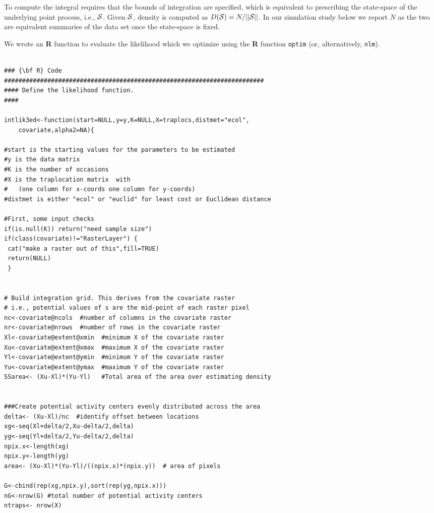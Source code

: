 \documentclass[12pt]{article}
\begin{document}
\begin{spacing}{1.2}
To compute the integral requires that the bounds of integration are
specified, which is equivalent to prescribing the state-space of the
underlying point process, i.e., ${\cal S}$. Given ${\cal S}$, density
is
computed as $D({\cal S}) = N/||{\cal S}||$. In our simulation study
below we report $N$ as the two are equivalent summaries of the data
set once the state-space is fixed.

We wrote an {\bf R} function to evaluate the likelihood which we optimize
using the {\bf R} function \mbox{\tt optim} (or, alternatively,
\mbox{\tt nlm}).

{\tiny
\begin{verbatim}

### {\bf R} Code
########################################################################
#### Define the likelihood function.
####
	
intlik3ed<-function(start=NULL,y=y,K=NULL,X=traplocs,distmet="ecol",
    covariate,alpha2=NA){  

#start is the starting values for the parameters to be estimated
#y is the data matrix
#K is the number of occasions
#X is the traplocation matrix  with 
#   (one column for x-coords one column for y-coords)
#distmet is either "ecol" or "euclid" for least cost or Euclidean distance

#First, some input checks
if(is.null(K)) return("need sample size")
if(class(covariate)!="RasterLayer") {
 cat("make a raster out of this",fill=TRUE)
 return(NULL)
 }


# Build integration grid. This derives from the covariate raster
# i.e., potential values of s are the mid-point of each raster pixel
nc<-covariate@ncols  #number of columns in the covariate raster
nr<-covariate@nrows  #number of rows in the covariate raster
Xl<-covariate@extent@xmin  #minimum X of the covariate raster
Xu<-covariate@extent@xmax  #maximum X of the covariate raster
Yl<-covariate@extent@ymin  #minimum Y of the covariate raster
Yu<-covariate@extent@ymax  #maximum Y of the covariate raster
SSarea<- (Xu-Xl)*(Yu-Yl)   #Total area of the area over estimating density


###Create potential activity centers evenly distributed across the area
delta<- (Xu-Xl)/nc  #identify offset between locations
xg<-seq(Xl+delta/2,Xu-delta/2,delta) 
yg<-seq(Yl+delta/2,Yu-delta/2,delta) 
npix.x<-length(xg)
npix.y<-length(yg)
area<- (Xu-Xl)*(Yu-Yl)/((npix.x)*(npix.y))  # area of pixels

G<-cbind(rep(xg,npix.y),sort(rep(yg,npix.x)))
nG<-nrow(G) #total number of potential activity centers 
ntraps<- nrow(X)


\end{verbatim}}
\end{spacing}
\end{document}
